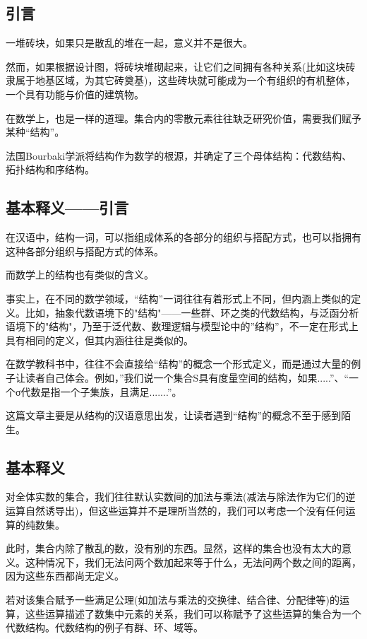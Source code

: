 

\subsection{引言}
一堆砖块，如果只是散乱的堆在一起，意义并不是很大。

然而，如果根据设计图，将砖块堆砌起来，让它们之间拥有各种关系(比如这块砖隶属于地基区域，为其它砖奠基)，这些砖块就可能成为一个有组织的有机整体，一个具有功能与价值的建筑物。

在数学上，也是一样的道理。集合内的零散元素往往缺乏研究价值，需要我们赋予某种“结构”。

法国Bourbaki学派将结构作为数学的根源，并确定了三个母体结构：代数结构、拓扑结构和序结构。

\subsection{基本释义——引言}
在汉语中，结构一词，可以指组成体系的各部分的组织与搭配方式，也可以指拥有这种各部分组织与搭配方式的体系。

而数学上的结构也有类似的含义。

事实上，在不同的数学领域，“结构”一词往往有着形式上不同，但内涵上类似的定义。比如，抽象代数语境下的"结构"——一些群、环之类的代数结构，与泛函分析语境下的"结构"，乃至于泛代数、数理逻辑与模型论中的”结构”，不一定在形式上具有相同的定义，但其内涵往往是类似的。

在数学教科书中，往往不会直接给“结构”的概念一个形式定义，而是通过大量的例子让读者自己体会。例如，”我们说一个集合S具有度量空间的结构，如果.....”、“一个σ代数是指一个子集族，且满足.......”。

这篇文章主要是从结构的汉语意思出发，让读者遇到“结构”的概念不至于感到陌生。

\subsection{基本释义}

对全体实数的集合，我们往往默认实数间的加法与乘法(减法与除法作为它们的逆运算自然诱导出)，但这些运算并不是理所当然的，我们可以考虑一个没有任何运算的纯数集。

此时，集合内除了散乱的数，没有别的东西。显然，这样的集合也没有太大的意义。这种情况下，我们无法问两个数加起来等于什么，无法问两个数之间的距离，因为这些东西都尚无定义。 

若对该集合赋予一些满足公理(如加法与乘法的交换律、结合律、分配律等)的运算，这些运算描述了数集中元素的关系，我们可以称赋予了这些运算的集合为一个代数结构。代数结构的例子有群、环、域等。

